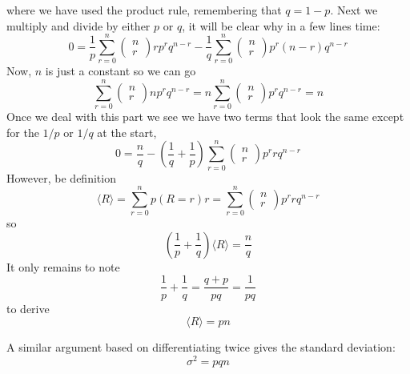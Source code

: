 \documentclass[11pt,a4paper]{scrartcl}
\begin{document}
where we have used the product rule, remembering that $q=1-p$. Next we multiply and divide by either $p$ or $q$, it will be clear why in a few lines time:
\begin{equation}
0=\frac{1}{p}\sum_{r=0}^n \left(\begin{array}{c}n\\r\end{array}\right)rp^rq^{n-r}
-\frac{1}{q}\sum_{r=0}^n \left(\begin{array}{c}n\\r\end{array}\right)p^r(n-r)q^{n-r}
\end{equation}
Now, $n$ is just a constant so we can go
\begin{equation}
\sum_{r=0}^n \left(\begin{array}{c}n\\r\end{array}\right)np^rq^{n-r}=n\sum_{r=0}^n \left(\begin{array}{c}n\\r\end{array}\right)p^rq^{n-r}=n
\end{equation}
Once we deal with this part we see we have two terms that look the same except for the $1/p$ or $1/q$ at the start, 
\begin{equation}
0=\frac{n}{q}-\left(\frac{1}{q}+\frac{1}{p}\right)\sum_{r=0}^n \left(\begin{array}{c}n\\r\end{array}\right)p^rrq^{n-r}
\end{equation}
However, be definition
\begin{equation}
\langle R\rangle=\sum_{r=0}^n p(R=r)r=\sum_{r=0}^n \left(\begin{array}{c}n\\r\end{array}\right)p^rrq^{n-r}
\end{equation}
so
\begin{equation}
\left(\frac{1}{p}+\frac{1}{q}\right)\langle R\rangle=\frac{n}{q}
\end{equation}
It only remains to note
\begin{equation}
\frac{1}{p}+\frac{1}{q}=\frac{q+p}{pq}=\frac{1}{pq}
\end{equation}
to derive
\begin{equation}
\langle R\rangle=pn
\end{equation}

A similar argument based on differentiating twice gives the standard
deviation:
\begin{equation}
\sigma^2=pqn
\end{equation}


\end{document}
